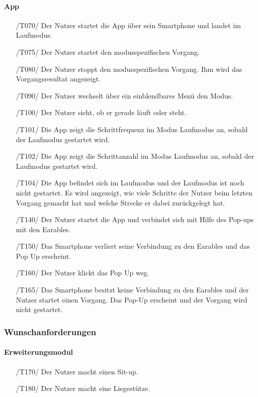 \documentclass[a4paper,12pt]{article}
\begin{document}
  \paragraph{App}
    \begin{itemize}
    \item[/T070/] Der Nutzer startet die App über sein Smartphone und landet im Laufmodus.
    \item[/T075/] Der Nutzer startet den modusspezifischen \Gls{Vorgang}.
    \item[/T080/] Der Nutzer stoppt den modusspezifischen \Gls{Vorgang}. Ihm wird das Vorgangsresultat angezeigt.
    \item[/T090/] Der Nutzer wechselt über ein einblendbares Menü den Modus.
    \item[/T100/] Der Nutzer sieht, ob er gerade \glqq läuft\grqq{} oder \glqq steht\grqq{}.
    \item[/T101/] Die App zeigt die \gls{Schrittfrequenz} im Modus \glqq{}Laufmodus\grqq{} an, sobald der Laufmodus gestartet wird.
    \item[/T102/] Die App zeigt die Schrittanzahl im Modus \glqq{}Laufmodus\grqq{} an, sobald der Laufmodus gestartet wird.
    \item[/T104/] Die App befindet sich im Laufmodus und der Laufmodus ist noch nicht gestartet. Es wird angezeigt, wie viele Schritte der Nutzer beim letzten Vorgang gemacht hat und welche Strecke er dabei zurückgelegt hat.   
    \item[/T140/] Der Nutzer startet die App und verbindet sich mit Hilfe des Pop-ups mit den \gls{Earables}.
    \item[/T150/] Das Smartphone verliert seine Verbindung zu den \gls{Earables} und das Pop Up erscheint.
    \item[/T160/] Der Nutzer klickt das Pop Up weg.
    \item[/T165/] Das Smartphone besitzt keine Verbindung zu den \gls{Earables} und der Nutzer startet einen Vorgang. Das Pop-Up erscheint und der Vorgang wird nicht gestartet.
  \end{itemize}

\subsubsection{Wunschanforderungen}
  \paragraph{Erweiterungsmodul}
    \begin{itemize}
    \item[/T170/] Der Nutzer macht einen Sit-up. 
    \item[/T180/] Der Nutzer macht eine Liegestütze.
  \end{itemize}
\end{document}
